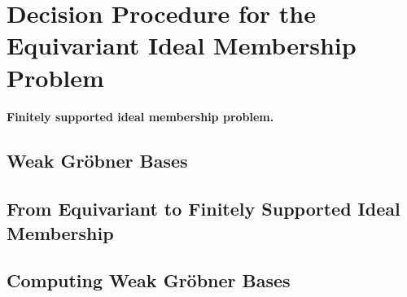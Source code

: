 \section{Decision Procedure for the Equivariant Ideal Membership Problem}
\label{sec:algorithm}

\paragraph{Finitely supported ideal membership problem.}


\subsection{Weak Gröbner Bases}
\label{subsec:weakgb}

\subsection{From Equivariant to Finitely Supported Ideal Membership}
\label{subsec:weakgb2dec}

\subsection{Computing Weak Gröbner Bases}
\label{subsec:weakgbcomp}

